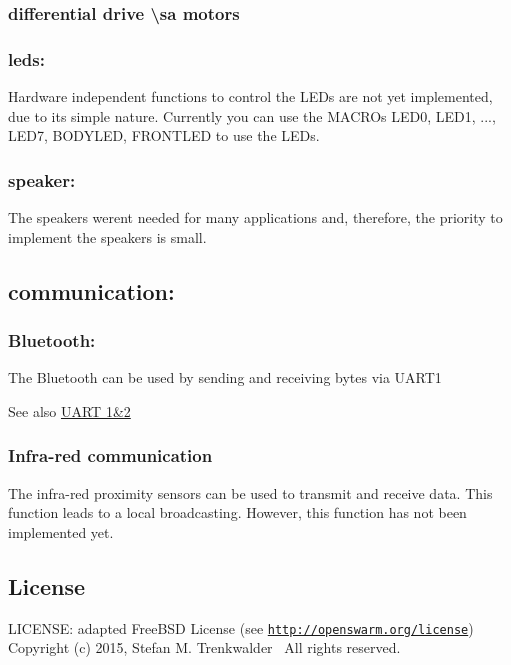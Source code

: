 \hypertarget{group__epuck_epuck_motors}{}\subsubsection{differential drive \textbackslash{}sa motors}\label{group__epuck_epuck_motors}
\hypertarget{group__epuck_epuck_led}{}\subsubsection{leds\+:}\label{group__epuck_epuck_led}
Hardware independent functions to control the L\+E\+Ds are not yet implemented, due to it\textquotesingle{}s simple nature. Currently you can use the M\+A\+C\+R\+Os L\+E\+D0, L\+E\+D1, ..., L\+E\+D7, B\+O\+D\+Y\+L\+E\+D, F\+R\+O\+N\+T\+L\+E\+D to use the L\+E\+Ds. \hypertarget{group__epuck_epuck_speaker}{}\subsubsection{speaker\+:}\label{group__epuck_epuck_speaker}
The speakers weren\textquotesingle{}t needed for many applications and, therefore, the priority to implement the speakers is small. \hypertarget{group__epuck_epuck_com}{}\subsection{communication\+:}\label{group__epuck_epuck_com}
\hypertarget{group__epuck_epuck_bluetooth}{}\subsubsection{Bluetooth\+:}\label{group__epuck_epuck_bluetooth}
The Bluetooth can be used by sending and receiving bytes via U\+A\+R\+T1 \begin{DoxySeeAlso}{See also}
\hyperlink{group__uart}{U\+A\+R\+T 1\&2} 
\end{DoxySeeAlso}
\hypertarget{group__epuck_epuck_ircom}{}\subsubsection{Infra-\/red communication}\label{group__epuck_epuck_ircom}
The infra-\/red proximity sensors can be used to transmit and receive data. This function leads to a local broadcasting. However, this function has not been implemented yet.\hypertarget{group__epuck_epuck_license}{}\subsection{License}\label{group__epuck_epuck_license}
L\+I\+C\+E\+N\+S\+E\+: adapted Free\+B\+S\+D License (see \href{http://openswarm.org/license}{\tt http\+://openswarm.\+org/license})~\newline
Copyright (c) 2015, Stefan M. Trenkwalder~\newline
All rights reserved. 